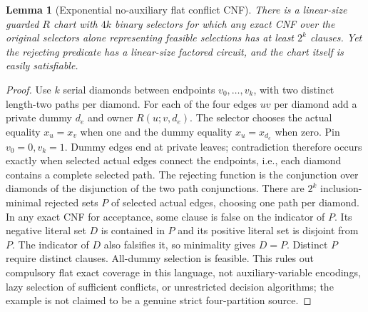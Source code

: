 \documentclass[11pt]{article}
\newtheorem{lemma}[theorem]{Lemma}
\begin{document}
\begin{lemma}[Exponential no-auxiliary flat conflict CNF]\label{lem:gd23-flat}
There is a linear-size guarded $R$ chart with $4k$ binary selectors for which any exact CNF over the original selectors alone representing feasible selections has at least $2^k$ clauses. Yet the rejecting predicate has a linear-size factored circuit, and the chart itself is easily satisfiable.
\end{lemma}
\begin{proof}
Use $k$ serial diamonds between endpoints $v_0,\ldots,v_k$, with two distinct length-two paths per diamond. For each of the four edges $uv$ per diamond add a private dummy $d_e$ and owner $R(u;v,d_e)$. The selector chooses the actual equality $x_u=x_v$ when one and the dummy equality $x_u=x_{d_e}$ when zero. Pin $v_0=0,v_k=1$. Dummy edges end at private leaves; contradiction therefore occurs exactly when selected actual edges connect the endpoints, i.e., each diamond contains a complete selected path. The rejecting function is the conjunction over diamonds of the disjunction of the two path conjunctions. There are $2^k$ inclusion-minimal rejected sets $P$ of selected actual edges, choosing one path per diamond. In any exact CNF for acceptance, some clause is false on the indicator of $P$. Its negative literal set $D$ is contained in $P$ and its positive literal set is disjoint from $P$. The indicator of $D$ also falsifies it, so minimality gives $D=P$. Distinct $P$ require distinct clauses. All-dummy selection is feasible. This rules out compulsory flat exact coverage in this language, not auxiliary-variable encodings, lazy selection of sufficient conflicts, or unrestricted decision algorithms; the example is not claimed to be a genuine strict four-partition source.
\end{proof}
\end{document}
